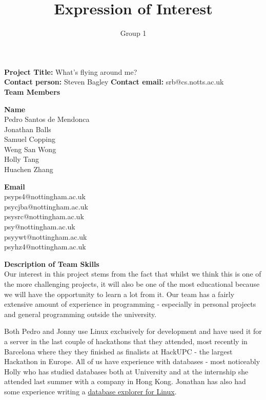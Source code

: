 \documentclass[11pt, oneside]{article}
\title{Expression of Interest}
\author{Group 1}
\begin{document}
\maketitle
\textbf{Project Title: }What's flying around me?\\
\textbf{Contact person: }Steven Bagley\newline
\textbf{Contact email: }srb@cs.notts.ac.uk\\
    
\vspace{0.3cm}
\textbf{Team Members}\newline
\begin{minipage}[t]{0.5\textwidth}
    \textbf{Name}\\
    Pedro Santos de Mendonca\\
    Jonathan Balls\\
    Samuel Copping\\
    Weng San Wong\\
    Holly Tang\\
    Huachen Zhang\\
\end{minipage}
\begin{minipage}[t]{0.5\textwidth}
    \textbf{Email}\\
    psyps4@nottingham.ac.uk \\
    psycjba@nottingham.ac.uk \\
    psysrc@nottingham.ac.uk \\
    psy@nottingham.ac.uk \\
    psyywt@nottingham.ac.uk \\
    psyhz4@nottingham.ac.uk \\
\end{minipage}

\textbf{Description of Team Skills}\\
Our interest in this project stems from the fact that whilst we think this is one of the more challenging projects, it will also be one of the most educational because we will have the opportunity to learn a lot from it. Our team has a fairly extensive amount of experience in programming - especially in personal projects and general programming outside the university.

Both Pedro and Jonny use Linux exclusively for development and have used it for a server in the last couple of hackathons that they attended, most recently in Barcelona where they they finished as finalists at HackUPC - the largest Hackathon in Europe. All of us have experience with databases - most noticeably Holly who has studied databases both at University and at the internship she attended last summer with a company in Hong Kong. Jonathan has also had some experience writing a \href{https://github.com/bonniejools/dumbo}{database explorer for Linux}.
\end{document}
